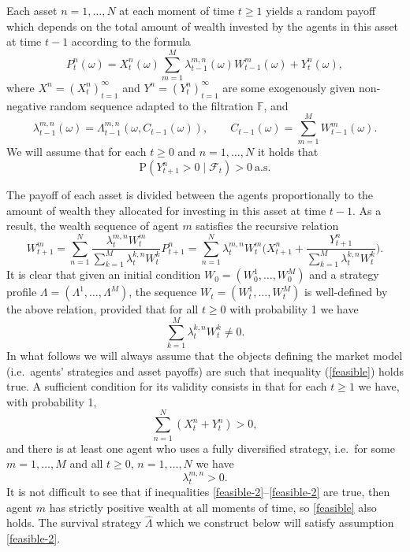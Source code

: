 \documentclass[a4paper,11pt,english]{article}
\theoremstyle{definition}
\renewcommand{\hat}{\widehat}
\renewcommand{\P}{\mathrm{P}}
\newcommand{\F}{\mathcal{F}}
\begin{document}
Each asset $n=1,\ldots,N$ at each moment of time $t\ge 1$ yields a random
payoff which depends on the total amount of wealth invested by the agents in
this asset at time $t-1$ according to the formula
\begin{equation}
P_t^n(\omega) = X_t^n(\omega) \sum_{m=1}^M
\lambda_{t-1}^{m,n}(\omega)W_{t-1}^m(\omega) + Y_t^n(\omega),\label{P}
\end{equation}
where $X^n = (X_t^n)_{t=1}^\infty$ and $Y^n = (Y_t^n)_{t=1}^\infty$ are some exogenously
given non-negative random sequence adapted to the filtration $\mathbb{F}$, and
\[
\lambda_{t-1}^{m,n}(\omega) = \Lambda_{t-1}^{m,n}(\omega,
C_{t-1}(\omega)),\qquad C_{t-1}(\omega) = \sum_{m=1}^M W_{t-1}^m(\omega).
\]
We will assume that for each $t\ge 0$ and
$n=1,\ldots,N$ it holds that
\begin{equation}
\P(Y_{t+1}^n >0 \mid \F_t) >0\ \text{a.s.}\label{Y-positive}
\end{equation}

The payoff of each asset is divided between the agents proportionally to the amount of
wealth they allocated for investing in this asset at time $t-1$. As a result, the wealth
sequence of agent $m$ satisfies the recursive relation
\begin{equation}
W_{t+1}^m = \sum_{n=1}^N \frac{\lambda_t^{m,n} W_t^m}{\sum_{k=1}^M
\lambda_t^{k,n} W_t^k} P_{t+1}^n = \sum_{n=1}^N\lambda_t^{m,n} W_t^m
\biggl(X_{t+1}^n + \frac{Y_{t+1}^n}{\sum_{k=1}^M \lambda_t^{k,n} W_t^k}
\biggr).\label{capital}
\end{equation}
It is clear that given an initial condition $W_0=(W_0^1,\ldots,W_0^M)$ and a
strategy profile $\Lambda=(\Lambda^1,\ldots,\Lambda^M)$, the sequence
$W_t=(W_t^1,\ldots,W_t^M)$ is well-defined by the above relation, provided
that for all $t \ge 0$ with probability 1 we have
\begin{equation}
\sum_{k=1}^M \lambda_t^{k,n} W_t^k \neq 0.\label{feasible}
\end{equation}
In what follows we will always assume that the objects defining the
market model (i.e.\ agents' strategies and asset payoffs) are such
that inequality (\ref{feasible}) holds true. A  sufficient condition for its
validity consists in that for each $t\ge 1$ we have, with probability 1,
\begin{equation}
\label{feasible-2}
\sum_{n=1}^N (X_t^n + Y_t^n) >0,
\end{equation}
and there is at least one agent who uses a fully diversified strategy, i.e.\
for some $m=1,\ldots,M$ and all $t\ge 0$, $n=1,\ldots, N$ we have
\begin{equation}
\label{feasible-2}
\lambda_t^{m,n} > 0.
\end{equation}
It is not difficult to see that if inequalities
\eqref{feasible-2}--\eqref{feasible-2} are true, then agent $m$ has 
strictly positive wealth at all moments of time, so \eqref{feasible} also
holds. The survival strategy $\hat\Lambda$ which we construct below will
satisfy assumption \eqref{feasible-2}.
\end{document}

